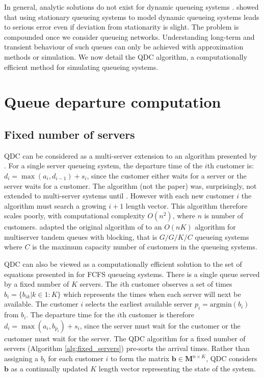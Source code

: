 \documentclass[article]{jss}
\begin{document}
In general, analytic solutions do not exist for dynamic queueing systems \citep{malone1995dynamic, worthington2009reflections}. \citet{green1991some} showed that using stationary queueing systems to model dynamic queueing systems leads to serious error even if deviation from stationarity is slight. The problem is compounded once we consider queueing networks. Understanding long-term and transient behaviour of such queues can only be achieved with approximation methods or simulation. We now detail the QDC algorithm, a computationally efficient method for simulating queueing systems. 

\section{Queue departure computation} \label{sec:QDC}

\subsection{Fixed number of servers}

QDC can be considered as a multi-server extension to an algorithm presented by \citet{lindley_theory_1952}. For a single server queueing system, the departure time of the $i$th customer is: $d_i = \max{(a_i, d_{i-1})} + s_i$, since the customer either waits for a server or the server waits for a customer. The algorithm (not the paper) was, surprisingly, not extended to multi-server systems until \citet{krivulin_recursive_1994}. However with each new customer $i$ the algorithm must search a growing $i+1$ length vector. This algorithm therefore scales poorly, with computational complexity $O(n^2)$, where $n$ is number of customers. \citet{kin_generalized_2010} adapted the original algorithm of \citet{kiefer_theory_1955} to an $O(nK)$ algorithm for multiserver tandem queues with blocking, that is $G/G/K/C$ queueing systems where $C$ is the maximum capacity number of customers in the queueing systems. 

QDC can also be viewed as a computationally efficient solution to the set of equations presented in \citet[pg. 259]{sutton_bayesian_2011} for FCFS queueing systems. There is a single queue served by a fixed number of $K$ servers. The $i$th customer observes a set of times $b_i = \{ b_{ik} | k \in 1:K \}$ which represents the times when each server will next be available. The customer $i$ selects the earliest available server $p_i = \text{argmin}(b_i)$ from $b_i$. The departure time for the $i$th customer is therefore $d_i = \max({a_i, b_{p_i}}) + s_i$, since the server must wait for the customer or the customer must wait for the server. The QDC algorithm for a fixed number of servers (Algorithm \ref{alg:fixed_servers}) pre-sorts the arrival times. Rather than assigning a $b_i$ for each customer $i$ to form the matrix $\mathbf{b} \in \mathbf{M}^{n \times K}$, QDC considers $\mathbf{b}$ as a continually updated $K$ length vector representing the state of the system. 
\end{document}
